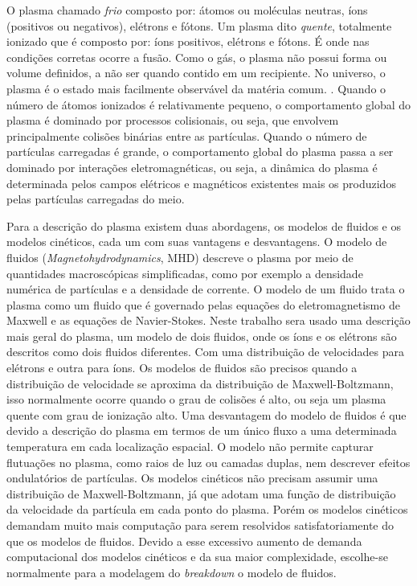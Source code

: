 \documentclass[12pt,oneside,a4paper]{abntex2}
\begin{document}
O plasma chamado \textit{frio} composto por: átomos ou moléculas neutras, íons (positivos ou negativos), elétrons e fótons. Um plasma dito \textit{quente}, totalmente ionizado que é composto por: íons positivos, elétrons e fótons. É onde nas condições corretas ocorre a fusão. Como o gás, o plasma não possui forma ou volume definidos, a não ser quando contido em um recipiente. No universo, o plasma é o estado mais facilmente observável da matéria comum. \cite{MagneticControl}.
Quando o número de átomos ionizados é relativamente pequeno, o comportamento global do plasma é dominado por processos colisionais, ou seja, que envolvem principalmente colisões binárias entre as partículas. Quando o número de partículas carregadas é grande, o comportamento global do plasma passa a ser dominado por interações eletromagnéticas, ou seja, a dinâmica do plasma é determinada pelos campos elétricos e magnéticos existentes mais os produzidos pelas partículas carregadas do meio. 

Para a descrição do plasma existem duas abordagens, os modelos de fluidos e os modelos cinéticos, cada um com suas vantagens e desvantagens. O modelo de fluidos (\textit{Magnetohydrodynamics}, MHD) descreve o plasma por meio de quantidades macroscópicas simplificadas, como por exemplo a  densidade numérica de partículas e a densidade de corrente. O modelo de um fluido trata o plasma como um fluido que é governado pelas equações do eletromagnetismo de Maxwell e as equações de Navier-Stokes. Neste trabalho sera usado uma descrição mais geral do plasma, um modelo de dois fluidos, onde os íons e os elétrons são descritos como dois fluidos diferentes. Com uma distribuição de velocidades para elétrons e outra para íons. Os modelos de fluidos são precisos quando  a distribuição de velocidade se aproxima da distribuição de Maxwell-Boltzmann, isso normalmente ocorre quando o grau de colisões é alto, ou seja um plasma quente com grau de ionização alto. Uma desvantagem do modelo de fluidos é que devido a descrição do plasma em termos de um único fluxo a uma determinada temperatura em cada localização espacial. O modelo não permite capturar flutuações no plasma, como raios de luz ou camadas duplas, nem descrever efeitos ondulatórios de partículas. Os modelos cinéticos não precisam assumir uma distribuição de Maxwell-Boltzmann, já que adotam uma função de distribuição da velocidade da partícula em cada ponto do plasma. Porém os modelos cinéticos demandam muito mais computação para serem resolvidos satisfatoriamente do que os modelos de fluidos. Devido a esse excessivo aumento de demanda computacional dos modelos cinéticos e da sua maior complexidade, escolhe-se normalmente para a modelagem do \textit{breakdown} o modelo de fluidos.
\end{document}
